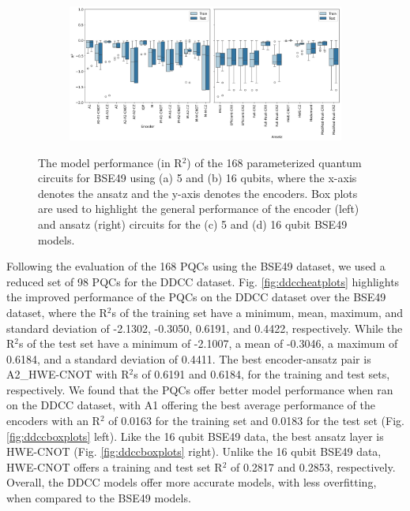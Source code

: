 \documentclass[journal=jacsat,manuscript=article]{achemso}
\begin{document}
\begin{figure}[H]
\begin{subfigure}[b]{0.49\textwidth}
		\caption{}
		\label{fig:5BSE_boxplots}
	\end{subfigure}
	\hfill
	\begin{subfigure}[b]{0.49\textwidth}
		\centering
		\includegraphics[width=\linewidth]{../images/BSE/sixteenqubit/BSE_boxplots}
		\caption{}
		\label{fig:16BSE_boxplots}
	\end{subfigure}
	\caption{The model performance (in R$^{2}$) of the 168 parameterized quantum circuits for BSE49 using (a) 5 and (b) 16 qubits, where the x-axis denotes the ansatz and the y-axis denotes the encoders. Box plots are used to highlight the general performance of the encoder (left) and ansatz (right) circuits for the (c) 5 and (d) 16 qubit BSE49 models.}
	\label{fig:BSEboxandheat}	
\end{figure}

Following the evaluation of the 168 PQCs using the BSE49 dataset, we used a reduced set of 98 PQCs for the DDCC dataset.
Fig. \ref{fig:ddccheatplots} highlights the improved performance of the PQCs on the DDCC dataset over the BSE49 dataset, where the R$^{2}$s of the training set have a minimum, mean, maximum, and standard deviation of -2.1302, -0.3050, 0.6191, and 0.4422, respectively.
While the R$^{2}$s of the test set have a minimum of -2.1007, a mean of -0.3046, a maximum of 0.6184, and a standard deviation of 0.4411.
The best encoder-ansatz pair is A2{\_}HWE-CNOT with R$^{2}$s of 0.6191 and 0.6184, for the training and test sets, respectively.
We found that the PQCs offer better model performance when ran on the DDCC dataset, with A1 offering the best average performance of the encoders with an R$^{2}$ of 0.0163 for the training set and 0.0183 for the test set (Fig. \ref{fig:ddccboxplots} left).
Like the 16 qubit BSE49 data, the best ansatz layer is HWE-CNOT (Fig. \ref{fig:ddccboxplots} right).
Unlike the 16 qubit BSE49 data, HWE-CNOT offers a training and test set R$^{2}$ of 0.2817 and 0.2853, respectively.
Overall, the DDCC models offer more accurate models, with less overfitting, when compared to the BSE49 models.
\end{document}

